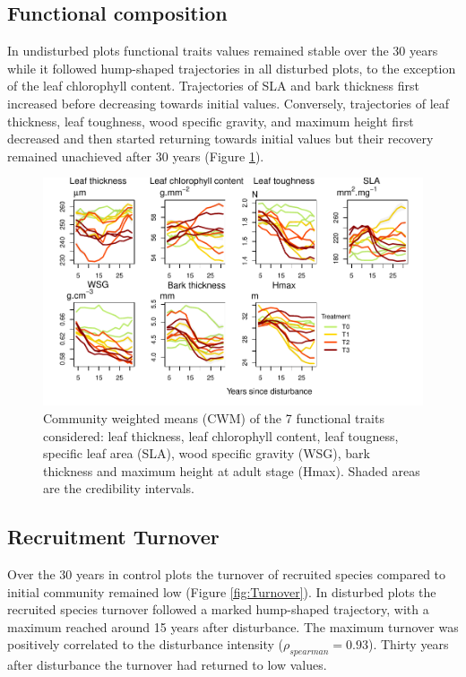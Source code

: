 \documentclass[fleqn,10pt]{ArtEcoFoG} %
\begin{document}
\subsection{Functional composition}\label{functional-composition}

In undisturbed plots functional traits values remained stable over the
30 years while it followed hump-shaped trajectories in all disturbed
plots, to the exception of the leaf chlorophyll content. Trajectories of
SLA and bark thickness first increased before decreasing towards initial
values. Conversely, trajectories of leaf thickness, leaf toughness, wood
specific gravity, and maximum height first decreased and then started
returning towards initial values but their recovery remained unachieved
after 30 years (Figure \ref{fig:CWM}).

\begin{figure}

{\centering \includegraphics{RecruitmentTrajectories_files/figure-latex/CWM-1} 

}

\caption{Community weighted means (CWM) of the 7 functional traits considered: leaf thickness, leaf chlorophyll content, leaf tougness, specific leaf area (SLA), wood specific gravity (WSG), bark thickness and maximum height at adult stage (Hmax). Shaded areas are the credibility intervals.}\label{fig:CWM}
\end{figure}

\subsection{Recruitment Turnover}\label{recruitment-turnover}

Over the 30 years in control plots the turnover of recruited species
compared to initial community remained low (Figure \ref{fig:Turnover}).
In disturbed plots the recruited species turnover followed a marked
hump-shaped trajectory, with a maximum reached around 15 years after
disturbance. The maximum turnover was positively correlated to the
disturbance intensity (\(\rho_{spearman}=0.93\)). Thirty years after
disturbance the turnover had returned to low values.
\end{document}

